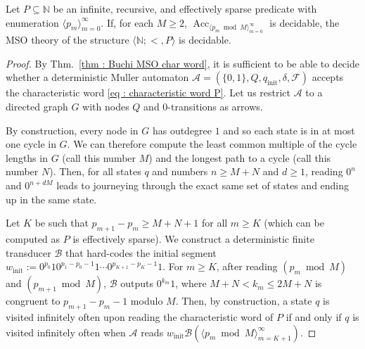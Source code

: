 \documentclass[a4paper,UKenglish,cleveref, autoref, thm-restate]{lipics-v2021}
\newcommand{\nat} {\mathbb{N}}
\newcommand{\Acc} {\operatorname{Acc}}
\begin{document}
\begin{proposition}\label{prop : reduction one unary predicate} 
Let $P \subseteq \nat$ be an infinite, recursive, and effectively
sparse predicate with enumeration $\langle p_m\rangle_{m=0}^\infty$.
If, for each $M \ge 2$, $\Acc_{\langle p_m\bmod M\rangle_{m=0}^\infty}$ is decidable, the MSO theory of the structure $\langle \nat; <, P \rangle$ is decidable.
\end{proposition}
\begin{proof}
  By Thm.~\ref{thm : Buchi MSO char word}, it is sufficient to be able
  to decide whether a deterministic Muller automaton
  $\mathcal{A} = (\{0,1\}, Q, q_{\text{init}}, \delta, \mathcal{F})$
  accepts the characteristic word \eqref{eq : characteristic word P}.
  Let us restrict $\mathcal{A}$ to a directed graph $G$ with nodes $Q$
  and $0$-transitions as arrows.

  By construction, every node in $G$ has outdegree $1$ and so each
  state is in at most one cycle in $G$.  We can therefore compute the
  least common multiple of the cycle lengths in $G$ (call this number
  $M$) and the longest path to a cycle (call this number $N$).  Then,
  for all states $q$ and numbers $n \ge M + N$ and $d \ge 1$, reading
  $0^n$ and $0^{n+dM}$ leads to journeying through the exact same set
  of states and ending up in the same state.

  Let $K$ be such that $p_{m+1} - p_m \ge M + N+1$ for all $m \ge K$
  (which can be computed as $P$ is effectively sparse).  We construct
  a deterministic finite transducer $\mathcal{B}$ that hard-codes the
  initial segment
  $w_\text{init} := 0^{p_0}10^{p_1-p_0-1}1\cdots
  0^{p_{K+1}-p_{K}-1}1$.  For $m \ge K$, after reading
  $(p_m\bmod M)$ and $(p_{m+1}\bmod M)$, $\mathcal{B}$ outputs
  $0^{k_m}1$, where $M+N < k_m \le 2M + N$ is congruent to
  $p_{m+1} - p_m - 1$ modulo $M$.  Then, by construction, a state $q$
  is visited infinitely often upon reading the characteristic word of
  $P$ if and only if $q$ is visited infinitely often when
  $\mathcal{A}$ reads
  $w_\text{init}\mathcal{B}(\langle p_m\bmod M\rangle_{m=K+1}^\infty)$.


\end{proof}
\end{document}
